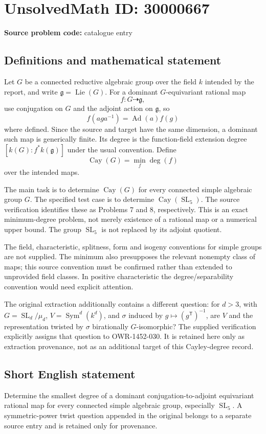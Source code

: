 \documentclass[11pt]{article}
\begin{document}
\section*{UnsolvedMath ID: 30000667}
\textbf{Source problem code:} catalogue entry
\subsection{Definitions and mathematical statement}
Let $G$ be a connected reductive algebraic group over the field $k$ intended by the report, and write $\mathfrak g=\operatorname{Lie}(G)$. For a dominant $G$-equivariant rational map
\[
 f:G\dashrightarrow\mathfrak g,
\]
use conjugation on $G$ and the adjoint action on $\mathfrak g$, so
\[
 f(aga^{-1})=\operatorname{Ad}(a)f(g)
\]
where defined. Since the source and target have the same dimension, a dominant such map is generically finite. Its degree is the function-field extension degree $[k(G):f^*k(\mathfrak g)]$ under the usual convention. Define
\[
 \operatorname{Cay}(G)=\min_f\deg(f)
\]
over the intended maps.

The main task is to determine $\operatorname{Cay}(G)$ for every connected simple algebraic group $G$. The specified test case is to determine $\operatorname{Cay}(\operatorname{SL}_5)$. The source verification identifies these as Problems 7 and 8, respectively. This is an exact minimum-degree problem, not merely existence of a rational map or a numerical upper bound. The group $\operatorname{SL}_5$ is not replaced by its adjoint quotient.

The field, characteristic, splitness, form and isogeny conventions for simple groups are not supplied. The minimum also presupposes the relevant nonempty class of maps; this source convention must be confirmed rather than extended to unprovided field classes. In positive characteristic the degree/separability convention would need explicit attention.

The original extraction additionally contains a different question: for $d>3$, with $G=\operatorname{SL}_d/\mu_d$, $V=\operatorname{Sym}^d(k^d)$, and $\sigma$ induced by $g\mapsto(g^{\mathsf T})^{-1}$, are $V$ and the representation twisted by $\sigma$ birationally $G$-isomorphic? The supplied verification explicitly assigns that question to OWR-1452-030. It is retained here only as extraction provenance, not as an additional target of this Cayley-degree record.
\subsection{Short English statement}
Determine the smallest degree of a dominant conjugation-to-adjoint equivariant rational map for every connected simple algebraic group, especially $\operatorname{SL}_5$. A symmetric-power twist question appended in the original belongs to a separate source entry and is retained only for provenance.
\end{document}
